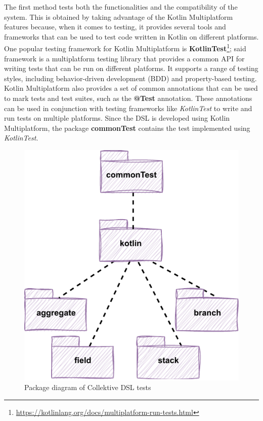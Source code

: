 The first method tests both the functionalities and the compatibility of the system. This is obtained by taking advantage of the Kotlin Multiplatform features because, when it comes to testing, it provides several tools and frameworks that can be used to test code written in Kotlin on different platforms.\newline
One popular testing framework for Kotlin Multiplatform is \textbf{KotlinTest}\footnote{\url{https://kotlinlang.org/docs/multiplatform-run-tests.html}}; said framework is a multiplatform testing library that provides a common API for writing tests that can be run on different platforms. It supports a range of testing styles, including behavior-driven development (BDD) and property-based testing.\newline
Kotlin Multiplatform also provides a set of common annotations that can be used to mark tests and test suites, such as the \textbf{@Test} annotation. These annotations can be used in conjunction with testing frameworks like \textit{KotlinTest} to write and run tests on multiple platforms.\newline
Since the DSL is developed using Kotlin Multiplatform, the package \textbf{commonTest} contains the test implemented using \textit{KotlinTest}.\newline
\begin{figure}[!ht]
    \centering
    \includegraphics[scale=1.1]{document/chapters/4-collektive/images/common_test_package_diagram.pdf}
    \caption{Package diagram of Collektive DSL tests}
    \label{fig:common_test_package_diagram}
\end{figure}
